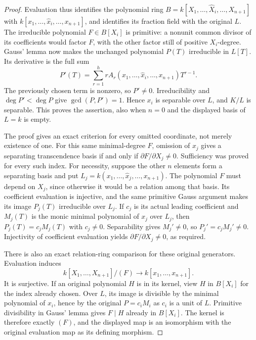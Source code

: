 \begin{proof}
Evaluation thus identifies the polynomial ring
$B=k[X_1,\ldots,\widehat X_i,\ldots,X_{n+1}]$
with $k[x_1,\ldots,\widehat x_i,\ldots,x_{n+1}]$,
and identifies its fraction field with the original $L$.
The irreducible polynomial $F\in B[X_i]$ is primitive:
a nonunit common divisor of its coefficients would
factor $F$, with the other factor still of positive
$X_i$-degree. Gauss' lemma now makes the unchanged
polynomial $P(T)$ irreducible in $L[T]$.
Its derivative is the full sum
$$
P'(T)=\sum_{r=1}^h r A_r(x_1,\ldots,\widehat x_i,\ldots,x_{n+1})T^{r-1}.
$$
The previously chosen term is nonzero, so $P'\neq0$.
Irreducibility and $\deg P'<\deg P$ give
$\gcd(P,P')=1$. Hence $x_i$ is separable over $L$,
and $K/L$ is separable. This proves the assertion,
also when $n=0$ and the displayed basis of $L=k$ is empty.

The proof gives an exact criterion for every omitted
coordinate, not merely existence of one. For this same
minimal-degree $F$, omission of $x_j$ gives a separating
transcendence basis if and only if
$\partial F/\partial X_j\neq0$. Sufficiency was proved
for every such index. For necessity, suppose the other
$n$ elements form a separating basis and put
$L_j=k(x_1,\ldots,\widehat x_j,\ldots,x_{n+1})$.
The polynomial $F$ must depend on $X_j$, since otherwise
it would be a relation among that basis. Its coefficient
evaluation is injective, and the same primitive Gauss
argument makes its image $P_j(T)$ irreducible over $L_j$.
If $c_j$ is its actual leading coefficient and $M_j(T)$
is the monic minimal polynomial of $x_j$ over $L_j$,
then $P_j(T)=c_jM_j(T)$ with $c_j\neq0$. Separability
gives $M_j'\neq0$, so $P_j'=c_jM_j'\neq0$.
Injectivity of coefficient evaluation yields
$\partial F/\partial X_j\neq0$, as required.

There is also an exact relation-ring comparison for
these original generators. Evaluation induces
$$
k[X_1,\ldots,X_{n+1}]/(F)
\longrightarrow k[x_1,\ldots,x_{n+1}].
$$
It is surjective. If an original polynomial $H$ is in
its kernel, view $H$ in $B[X_i]$ for the index already
chosen. Over $L$, its image is divisible by the
minimal polynomial of $x_i$, hence by the original
$P=c_iM_i$ as $c_i$ is a unit of $L$. Primitive
divisibility in Gauss' lemma gives $F\mid H$ already
in $B[X_i]$. The kernel is therefore exactly $(F)$,
and the displayed map is an isomorphism with the
original evaluation map as its defining morphism.
\end{proof}